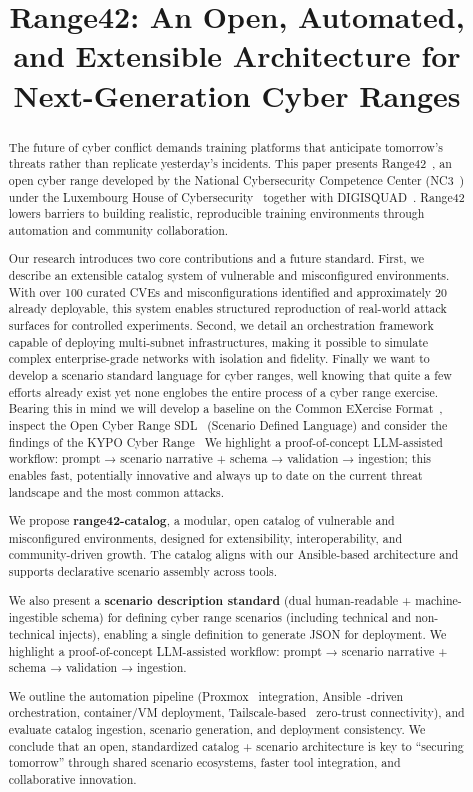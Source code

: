 \documentclass[11pt]{article}
\title{Range42: An Open, Automated, and Extensible Architecture for Next-Generation Cyber Ranges}
\author{} %
\date{}   %
\begin{document}
\maketitle

\begin{abstract}
The future of cyber conflict demands training platforms that anticipate tomorrow's threats rather than replicate yesterday's incidents. This paper presents Range42~\cite{range42}, an open cyber range developed by the National Cybersecurity Competence Center (NC3~\cite{NC3}) under the Luxembourg House of Cybersecurity~\cite{LHC} together with DIGISQUAD~\cite{DIGISQUAD}. Range42 lowers barriers to building realistic, reproducible training environments through automation and community collaboration.

Our research introduces two core contributions and a future standard. First, we describe an extensible catalog system of vulnerable and misconfigured environments. With over 100 curated CVEs and misconfigurations identified and approximately 20 already deployable, this system enables structured reproduction of real-world attack surfaces for controlled experiments. Second, we detail an orchestration framework capable of deploying multi-subnet infrastructures, making it possible to simulate complex enterprise-grade networks with isolation and fidelity. Finally we want to develop a scenario standard language for cyber ranges, well knowing that quite a few efforts already exist yet none englobes the entire process of a cyber range exercise. Bearing this in mind we will develop a baseline on the Common EXercise Format~\cite{cexf}, inspect the Open Cyber Range SDL~\cite{SDL} (Scenario Defined Language) and consider the findings of the KYPO Cyber Range~\cite{kypo2020} We highlight a proof-of-concept LLM-assisted workflow: prompt → scenario narrative + schema → validation → ingestion; this enables fast, potentially innovative and always up to date on the current threat landscape and the most common attacks.

We propose \textbf{range42-catalog}, a modular, open catalog of vulnerable and misconfigured environments, designed for extensibility, interoperability, and community-driven growth. The catalog aligns with our Ansible-based architecture and supports declarative scenario assembly across tools.

We also present a \textbf{scenario description standard} (dual human-readable + machine-ingestible schema) for defining cyber range scenarios (including technical and non-technical injects), enabling a single definition to generate JSON for deployment. We highlight a proof-of-concept LLM-assisted workflow: prompt → scenario narrative + schema → validation → ingestion.

We outline the automation pipeline (Proxmox~\cite{proxmox} integration, Ansible~\cite{ansible}-driven orchestration, container/VM deployment, Tailscale-based~\cite{tailscale} zero-trust connectivity), and evaluate catalog ingestion, scenario generation, and deployment consistency. We conclude that an open, standardized catalog + scenario architecture is key to “securing tomorrow” through shared scenario ecosystems, faster tool integration, and collaborative innovation.
\end{abstract}
\end{document}
